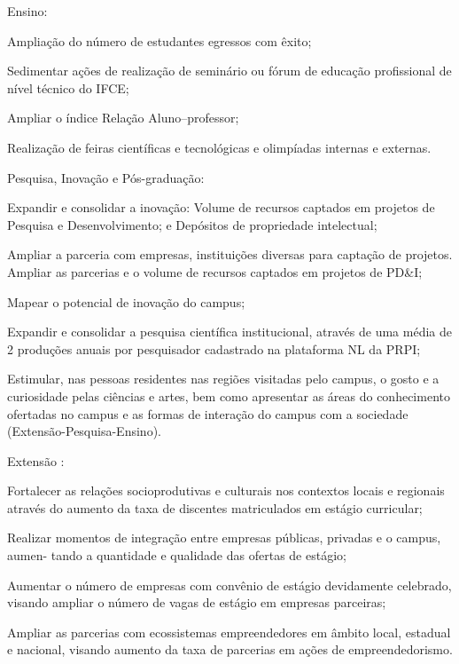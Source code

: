 \documentclass[
	12pt,				%
	openright,			%
	twoside,			%
	a4paper,			%
	chapter=TITLE,		%
	english,			%
	french,				%
	spanish,			%
	brazil,				%
	]{abntex2}
\begin{document}
\begin{alineas}
	\item Ensino:
	\begin{alineas}
	  \item Ampliação do número de estudantes egressos com êxito;
	  \item Sedimentar ações de realização de seminário ou fórum de educação profissional de nível técnico do IFCE;
	  \item Ampliar o índice Relação Aluno–professor;
	  \item Realização de feiras científicas e tecnológicas e olimpíadas internas e externas.
	\end{alineas}
	
	\item Pesquisa, Inovação e Pós-graduação:
	\begin{alineas}
	  \item Expandir e consolidar a inovação: Volume de recursos captados em projetos de Pesquisa e Desenvolvimento; e Depósitos de propriedade intelectual;
	  \item Ampliar a parceria com empresas, instituições diversas para captação de projetos. Ampliar as parcerias e o volume de recursos captados em projetos de PD\&I;
	  \item Mapear o potencial de inovação do campus;
	  \item Expandir e consolidar a pesquisa científica institucional, através de uma média de 2 produções anuais por pesquisador cadastrado na plataforma NL da PRPI;
	  \item Estimular, nas pessoas residentes nas regiões visitadas pelo campus, o gosto e a curiosidade pelas ciências e artes, bem como apresentar as áreas do conhecimento ofertadas no campus e as formas de interação do campus com a sociedade (Extensão-Pesquisa-Ensino).
	\end{alineas}
	
	\item Extensão :
	\begin{alineas}
	  \item Fortalecer as relações socioprodutivas e culturais nos contextos locais e regionais através do aumento da taxa de discentes matriculados em estágio curricular;
	  \item Realizar momentos de integração entre empresas públicas, privadas e o campus, aumen- tando a quantidade e qualidade das ofertas de estágio;
	  \item Aumentar o número de empresas com convênio de estágio devidamente celebrado, visando ampliar o número de vagas de estágio em empresas parceiras;
		\item Ampliar as parcerias com ecossistemas empreendedores em âmbito local, estadual e nacional, visando aumento da taxa de parcerias em ações de empreendedorismo.
	  

	\end{alineas}
\end{alineas}
\end{document}
